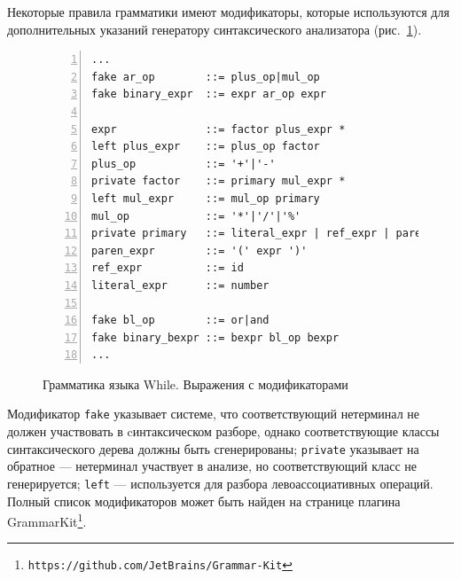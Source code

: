 Некоторые правила грамматики имеют модификаторы, которые используются для дополнительных указаний генератору синтаксического анализатора (рис.~\ref{ov:whileII}).
\begin{figure}[h]
    \begin{lstlisting}[numbers=left, numbersep=3pt, basicstyle=\ttfamily\small, numberstyle=\tiny, frame=bottom, language={}]
...
fake ar_op        ::= plus_op|mul_op
fake binary_expr  ::= expr ar_op expr 

expr              ::= factor plus_expr *
left plus_expr    ::= plus_op factor
plus_op           ::= '+'|'-'
private factor    ::= primary mul_expr *
left mul_expr     ::= mul_op primary
mul_op            ::= '*'|'/'|'%'
private primary   ::= literal_expr | ref_expr | paren_expr
paren_expr        ::= '(' expr ')'
ref_expr          ::= id
literal_expr      ::= number

fake bl_op        ::= or|and
fake binary_bexpr ::= bexpr bl_op bexpr
...
    \end{lstlisting}
    \caption{Грамматика языка While. Выражения с модификаторами}%
    \label{ov:whileII}
\end{figure}
\noindent
Модификатор \lstinline{fake} указывает системе, что соответствующий нетерминал не должен участвовать в cинтаксическом разборе,
однако соответствующие классы синтаксического дерева должны быть сгенерированы;
\lstinline{private} указывает на обратное --- нетерминал участвует в анализе, но соответствующий класс не генерируется;
\lstinline{left} --- используется для разбора левоассоциативных операций.
Полный список модификаторов может быть найден на странице плагина
GrammarKit\footnote{\texttt{https://github.com/JetBrains/Grammar-Kit}}.


